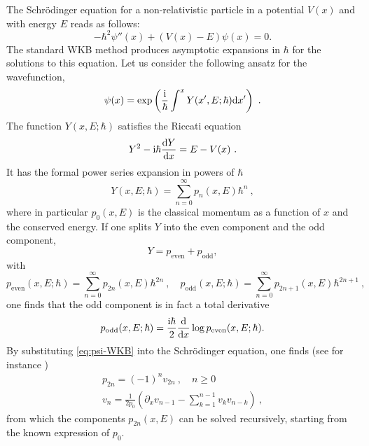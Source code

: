 \documentclass[a4paper,11pt]{article}
\theoremstyle{definition}
\newcommand{\ri}{{\rm i}}
\newcommand{\rd}{{\rm d}}
\newcommand{\be}{\begin{equation}}
\newcommand{\ee}{\end{equation}}
\def\({\left(}
\def\){\right)}
\newcommand{\pd}{\partial}
\begin{document}
The Schr\"odinger equation for a non-relativistic particle in a
potential $V(x)$ and with energy $E$ reads as follows:
%
\be
\label{schrodinger}
-\hbar^2 \psi''(x) + (V(x)-E) \psi(x)=0. 
\ee
%
The standard WKB method produces asymptotic expansions in $\hbar$ for
the solutions to this equation.  Let us consider the following ansatz
for the wavefunction,
%
\begin{equation}\label{eq:psi-WKB}
  \psi(x) = \exp\(\frac{\ri}{\hbar}\int^x Y(x',E;\hbar) \rd x'\) \ .
\end{equation}
%
The function $Y(x,E;\hbar)$ satisfies the Riccati equation
%
\begin{equation}\label{riccati}
  Y^2 - \ri \hbar \frac{\rd Y}{\rd x} = E - V(x)
  \ .
\end{equation}
%
It has the formal power series expansion in powers of $\hbar$
%
\begin{equation}\label{ricwkb}
  Y(x,E;\hbar) = \sum_{n=0}^\infty p_n(x,E) \hbar^n \ ,
\end{equation}
%
where in particular $p_0(x, E)$ is the classical momentum as a
function of $x$ and the conserved energy. If one splits $Y$ into the even component and the odd component,
%
\be
Y = p_{\text{even}}+p_{\text{odd}}, 
\ee
%
 with
\begin{equation}
\label{p-series}
  p_{\text{even}}(x,E;\hbar) = \sum_{n=0}^\infty p_{2n}(x,E)\hbar^{2n}
  \ ,\quad
  p_{\text{odd}}(x,E;\hbar) = \sum_{n=0}^\infty
  p_{2n+1}(x,E)\hbar^{2n+1} \ ,
\end{equation}
%
one finds that the odd component is in fact a total derivative
%
\begin{equation}
  p_{\text{odd}}(x,E;\hbar) = \frac{\ri\hbar}{2}\frac{\rd}{\rd x} \log
  p_{\text{even}}(x,E;\hbar).
\end{equation}
%
By substituting \eqref{eq:psi-WKB} into the Schr\"{o}dinger equation,
one finds (see for instance \cite{bpv})
%
\begin{gather}
  p_{2n} = (-1)^n v_{2n} \ , \quad n \geq 0 \\
  v_{n} = \frac{1}{2p_0}\(\pd_xv_{n-1} - \sum_{k=1}^{n-1}v_k v_{n-k}\) \ ,
\end{gather}
%
from which the components $p_{2n}(x,E)$ can be solved recursively,
starting from the known expression of $p_0$.
\end{document}
